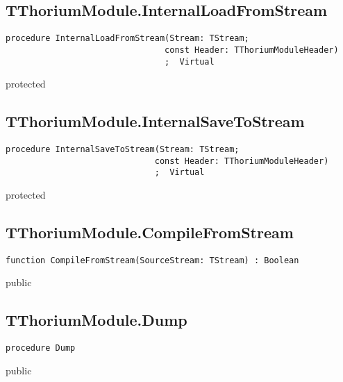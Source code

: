 \subsection{TThoriumModule.InternalLoadFromStream}
\label{thoriumcore:thorium:tthoriummodule:internalloadfromstream}
\begin{FPCList}
\Synopsis
\Declaration 

\begin{verbatim}
procedure InternalLoadFromStream(Stream: TStream;
                                const Header: TThoriumModuleHeader)
                                ;  Virtual
\end{verbatim}
\Visibility
protected
\Description
\Errors
\end{FPCList}
\subsection{TThoriumModule.InternalSaveToStream}
\label{thoriumcore:thorium:tthoriummodule:internalsavetostream}
\begin{FPCList}
\Synopsis
\Declaration 

\begin{verbatim}
procedure InternalSaveToStream(Stream: TStream;
                              const Header: TThoriumModuleHeader)
                              ;  Virtual
\end{verbatim}
\Visibility
protected
\Description
\Errors
\end{FPCList}
\subsection{TThoriumModule.CompileFromStream}
\label{thoriumcore:thorium:tthoriummodule:compilefromstream}
\begin{FPCList}
\Synopsis
\Declaration 

\begin{verbatim}
function CompileFromStream(SourceStream: TStream) : Boolean
\end{verbatim}
\Visibility
public
\Description
\Errors
\end{FPCList}
\subsection{TThoriumModule.Dump}
\label{thoriumcore:thorium:tthoriummodule:dump}
\begin{FPCList}
\Synopsis
\Declaration 

\begin{verbatim}
procedure Dump
\end{verbatim}
\Visibility
public
\Description
\Errors
\end{FPCList}
